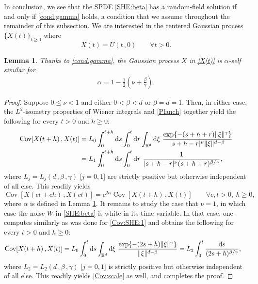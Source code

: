 \documentclass[reqno]{amsart}
\DeclareMathOperator{\Cov}{Cov}
\newcommand{\<}{\langle}
\renewcommand{\>}{\rangle}
\newcommand{\R}{\mathbb{R}}
\newcommand{\1}{\mathbb{1}}
\renewcommand{\d}{{\rm d}}
\renewcommand{\ge}{\geqslant}
\renewcommand{\le}{\leqslant}
\newtheorem{lemma}[stat]{Lemma}
\theoremstyle{definition}
\numberwithin{equation}{section}
\begin{document}
In conclusion, we see that the SPDE \eqref{SHE:beta} has a random-field solution if and only if
\eqref{cond:gamma} holds, a condition that we assume throughout the remainder
of this subsection. We are
interested in the centered Gaussian process $\{X(t)\}_{t\ge0}$ where
\begin{equation}\label{X(t)}
	X(t) = U(t\,,0)\qquad\forall t>0.
\end{equation}


\begin{lemma}\label{lem:X:scale}
	Thanks to \eqref{cond:gamma}, the Gaussian process $X$ in \eqref{X(t)}
	is $\alpha$-self similar for
	\begin{align}\label{alpha}
		\alpha =  1 - \frac12\left( \nu + \frac{\beta}{\gamma}\right).
	\end{align}
\end{lemma}

\begin{proof}
	Suppose $0\le\nu<1$ and either $0<\beta<d$ or
	$\beta=d=1$. Then, in either case,
	the $L^2$-isometry properties of
	Wiener integrals and \eqref{Planch} together
	yield the following for every $t>0$ and $h\ge0$:
	\begin{equation}\label{Cov:SHE:1}\begin{split}
		\Cov[X(t+h)\,,X(t)] 
			&= L_0\int_0^{t+h}\d s\int_0^t\d r\int_{\R^d}\d\xi\
			\frac{\exp\{-(s+h+r)\|\xi\|^\gamma\}}{|s+h-r|^\nu\|\xi\|^{d-\beta}}\\
		&=L_1\int_0^{t+h}\d s\int_0^t\d r\ \frac{1}{|s+h-r|^\nu(s+h+r)^{\beta/\gamma}},
	\end{split}\end{equation}
	where $L_j=L_j(d\,,\beta\,,\gamma)$ [$j=0,1$] are strictly positive but otherwise
	independent of all else. This readily yields
	\begin{equation}\label{Cov:scale}
		\Cov[X(ct+ch)\,,X(ct)] = c^{2\alpha}\Cov[X(t+h)\,,X(t)]\qquad
		\forall c,t>0,\ h\ge0,
	\end{equation}
	where $\alpha$ is defined in Lemma \ref{lem:X:scale}. It remains to study the case
	that $\nu=1$, in which case the noise
	$\dot{W}$ in \eqref{SHE:beta} is white in its time variable.	
	In that case, one computes similarly as was done for \eqref{Cov:SHE:1} and obtains
	the following for every $t>0$ and $h\ge0$:
	\begin{equation*}\begin{split}
		\Cov[X(t+h)\,,X(t)] &= L_0 \int_0^t\d s\int_{\R^d}\d\xi\
			\frac{\exp\{-(2s+h)\|\xi\|^\gamma\}}{\|\xi\|^{d-\beta}}
		= L_2\int_0^t \frac{\d s}{(2s+h)^{\beta/\gamma}},
	\end{split}\end{equation*}
	where $L_2=L_2(d\,,\beta\,,\gamma)$ [$j=0,1$] is strictly positive but otherwise
	independent of all else. 
	This readily yields \eqref{Cov:scale} as well, and completes the proof.
\end{proof}
\end{document}
